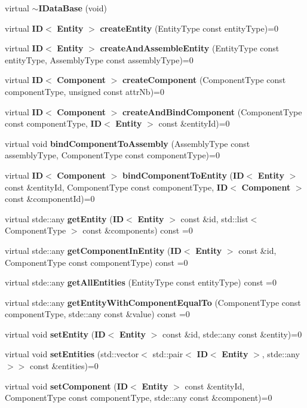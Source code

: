 \begin{DoxyCompactItemize}
\item 
virtual {\bf $\sim$\+I\+Data\+Base} (void)
\item 
virtual {\bf ID}$<$ {\bf Entity} $>$ {\bf create\+Entity} (Entity\+Type const entity\+Type)=0
\item 
virtual {\bf ID}$<$ {\bf Entity} $>$ {\bf create\+And\+Assemble\+Entity} (Entity\+Type const entity\+Type, Assembly\+Type const assembly\+Type)=0
\item 
virtual {\bf ID}$<$ {\bf Component} $>$ {\bf create\+Component} (Component\+Type const component\+Type, unsigned const attr\+Nb)=0
\item 
virtual {\bf ID}$<$ {\bf Component} $>$ {\bf create\+And\+Bind\+Component} (Component\+Type const component\+Type, {\bf ID}$<$ {\bf Entity} $>$ const \&entity\+Id)=0
\item 
virtual void {\bf bind\+Component\+To\+Assembly} (Assembly\+Type const assembly\+Type, Component\+Type const component\+Type)=0
\item 
virtual {\bf ID}$<$ {\bf Component} $>$ {\bf bind\+Component\+To\+Entity} ({\bf ID}$<$ {\bf Entity} $>$ const \&entity\+Id, Component\+Type const component\+Type, {\bf ID}$<$ {\bf Component} $>$ const \&component\+Id)=0
\item 
virtual stde\+::any {\bf get\+Entity} ({\bf ID}$<$ {\bf Entity} $>$ const \&id, std\+::list$<$ Component\+Type $>$ const \&components) const =0
\item 
virtual stde\+::any {\bf get\+Component\+In\+Entity} ({\bf ID}$<$ {\bf Entity} $>$ const \&id, Component\+Type const component\+Type) const =0
\item 
virtual stde\+::any {\bf get\+All\+Entities} (Entity\+Type const entity\+Type) const =0
\item 
virtual stde\+::any {\bf get\+Entity\+With\+Component\+Equal\+To} (Component\+Type const component\+Type, stde\+::any const \&value) const =0
\item 
virtual void {\bf set\+Entity} ({\bf ID}$<$ {\bf Entity} $>$ const \&id, stde\+::any const \&entity)=0
\item 
virtual void {\bf set\+Entities} (std\+::vector$<$ std\+::pair$<$ {\bf ID}$<$ {\bf Entity} $>$, stde\+::any $>$$>$ const \&entities)=0
\item 
virtual void {\bf set\+Component} ({\bf ID}$<$ {\bf Entity} $>$ const \&entity\+Id, Component\+Type const component\+Type, stde\+::any const \&component)=0
\end{DoxyCompactItemize}


